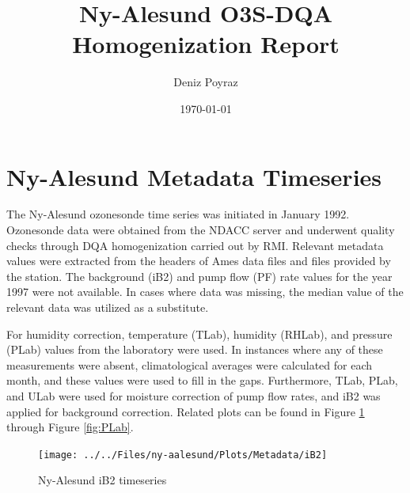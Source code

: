 \documentclass{article}
\title{Ny-Alesund O3S-DQA Homogenization Report}
\author{Deniz Poyraz}
\date{\today}
\begin{document}
\maketitle

\section{Ny-Alesund Metadata Timeseries}
\label{sec:metadata}
The Ny-Alesund ozonesonde time series was initiated in January 1992.
Ozonesonde data were obtained from the NDACC server and underwent quality checks through DQA homogenization
carried out by RMI. Relevant metadata values were extracted from the headers of Ames data files and
files provided by the station.
The background (iB2) and pump flow (PF) rate values for the year 1997 were not available.
In cases where data was missing, the median value of the relevant data was utilized as a substitute.

For humidity correction, temperature (TLab), humidity (RHLab), and pressure (PLab) values from the laboratory were used.
In instances where any of these measurements were absent, climatological averages were calculated for each month,
and these values were used to fill in the gaps.
Furthermore, TLab, PLab, and ULab were used for moisture correction of pump flow rates, and iB2 was applied for
background correction. Related plots can be found in Figure \ref{fig:iB2} through Figure \ref{fig:PLab}.




\begin{figure}
\centering
\texttt{[image: ../../Files/ny-aalesund/Plots/Metadata/iB2]}
\caption{Ny-Alesund iB2 timeseries}
\label{fig:iB2}
\end{figure}
\end{document}
